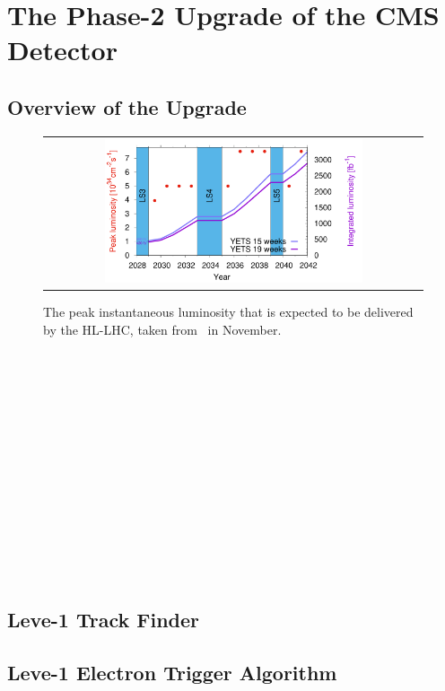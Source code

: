 \chapter{The Phase-2 Upgrade of the CMS Detector}
\label{chap:Upgrade}

\section{Overview of the Upgrade}

\begin{figure}[tbh!]
 \begin{center}
 \begin{tabular}{c}
 \includegraphics[width=0.7\textwidth]{figures/Part2/Upgrade/Lumi}
 \end{tabular}
 \caption{The peak instantaneous luminosity that is expected to be delivered by the \ac{HL-LHC}, taken from~\cite{LHC:plan} in November.}
 \label{fig:Lumi}
 \end{center}
\end{figure}

~\cite{CMS:2017lum}

~\cite{ECAL:upgrade}

~\cite{Hebbeker:2017bix}

~\cite{CMS:2017jpq}

~\cite{Butler:2019rpu}

~\cite{Zabi:2020gjd}

~\cite{HLT:Upgrade}

~\cite{Beam:Upgrade}

\section{Leve-1 Track Finder}

\section{Leve-1 Electron Trigger Algorithm}